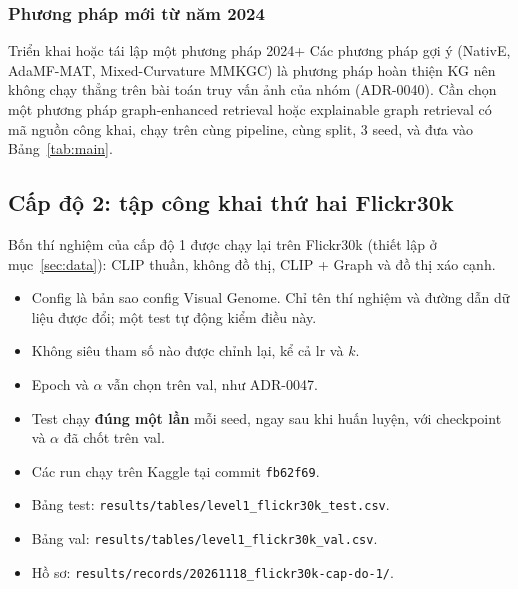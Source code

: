 \documentclass[12pt, a4paper]{article}
\newcommand{\code}[1]{\texttt{#1}}
\begin{document}
\subsubsection{Phương pháp mới từ năm 2024}
\begin{chualam}{Triển khai hoặc tái lập một phương pháp 2024+}
Các phương pháp gợi ý (NativE, AdaMF-MAT, Mixed-Curvature MMKGC) là phương pháp hoàn thiện KG nên không chạy thẳng trên bài toán truy vấn ảnh của nhóm (ADR-0040). Cần chọn một phương pháp graph-enhanced retrieval hoặc explainable graph retrieval có mã nguồn công khai, chạy trên cùng pipeline, cùng split, 3 seed, và đưa vào Bảng~\ref{tab:main}.
\end{chualam}

\subsection{Cấp độ 2: tập công khai thứ hai Flickr30k}
\label{sec:flickr}
Bốn thí nghiệm của cấp độ 1 được chạy lại trên Flickr30k (thiết lập ở mục~\ref{sec:data}): CLIP thuần, không đồ thị, CLIP + Graph và đồ thị xáo cạnh.
\begin{itemize}
\item Config là bản sao config Visual Genome. Chỉ tên thí nghiệm và đường dẫn dữ liệu được đổi; một test tự động kiểm điều này.
\item Không siêu tham số nào được chỉnh lại, kể cả lr và $k$.
\item Epoch và $\alpha$ vẫn chọn trên val, như ADR-0047.
\item Test chạy \textbf{đúng một lần} mỗi seed, ngay sau khi huấn luyện, với checkpoint và $\alpha$ đã chốt trên val.
\item Các run chạy trên Kaggle tại commit \code{fb62f69}.
\item Bảng test: \code{results/tables/level1\_flickr30k\_test.csv}.
\item Bảng val: \code{results/tables/level1\_flickr30k\_val.csv}.
\item Hồ sơ: \code{results/records/20261118\_flickr30k-cap-do-1/}.
\end{itemize}
\end{document}
